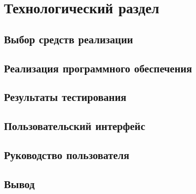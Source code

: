 \section{Технологический раздел}



\subsection{Выбор средств реализации}


\subsection{Реализация программного обеспечения}


\subsection{Результаты тестирования}


\subsection{Пользовательский интерфейс}


\subsection{Руководство пользователя}

\subsection*{Вывод}

